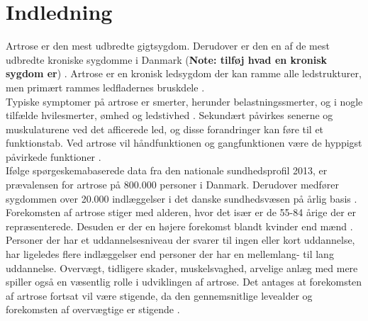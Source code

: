\section{Indledning}
Artrose er den mest udbredte gigtsygdom. Derudover er den en af de mest udbredte kroniske sygdomme i Danmark (\textbf{Note: tilføj hvad en kronisk sygdom er}) \citep{sygdom}. Artrose er en kronisk ledsygdom der kan ramme alle ledstrukturer, men primært rammes ledfladernes bruskdele \citep{schroder}. \\
Typiske symptomer på artrose er smerter, herunder belastningssmerter, og i nogle tilfælde hvilesmerter, ømhed og ledstivhed . Sekundært påvirkes senerne og muskulaturene ved det afficerede led, og disse forandringer kan føre til et funktionstab. Ved artrose vil håndfunktionen og gangfunktionen være de hyppigst påvirkede funktioner \cite{schroder}. \\
Ifølge spørgeskemabaserede data fra den nationale sundhedsprofil 2013, er prævalensen for artrose på 800.000 personer i Danmark. Derudover medfører sygdommen over 20.000 indlæggelser i det danske sundhedsvæsen på årlig basis \citep{sygdom}. Forekomsten af artrose stiger med alderen, hvor det især er de 55-84 årige der er repræsenterede. Desuden er der en højere forekomst blandt kvinder end mænd \citep{sygdom}. Personer der har et uddannelsesniveau der svarer til ingen eller kort uddannelse, har ligeledes flere indlæggelser end personer der har en mellemlang- til lang uddannelse. Overvægt, tidligere skader, muskelsvaghed, arvelige anlæg med mere spiller også en væsentlig rolle i udviklingen af artrose. Det antages at forekomsten af artrose fortsat vil være stigende, da den gennemsnitlige levealder og forekomsten af overvægtige er stigende \citep{sygdom}. 


